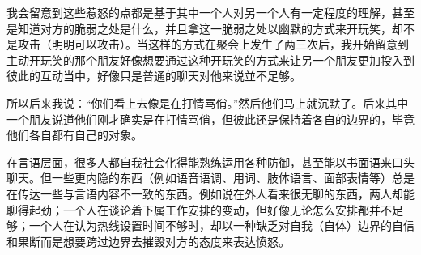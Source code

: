 我会留意到这些惹怒的点都是基于其中一个人对另一个人有一定程度的理解，甚至是知道对方的脆弱之处是什么，并且拿这一脆弱之处以幽默的方式来开玩笑，却不是攻击（明明可以攻击）。当这样的方式在聚会上发生了两三次后，我开始留意到主动开玩笑的那个朋友好像想要通过这种开玩笑的方式来让另一个朋友更加投入到彼此的互动当中，好像只是普通的聊天对他来说並不足够。

所以后来我说：“你们看上去像是在打情骂俏。”然后他们马上就沉默了。后来其中一个朋友说道他们刚才确实是在打情骂俏，但彼此还是保持着各自的边界的，毕竟他们各自都有自己的对象。

在言语层面，很多人都自我社会化得能熟练运用各种防御，甚至能以书面语来口头聊天。但一些更内隐的东西（例如语音语调、用词、肢体语言、面部表情等）总是在传达一些与言语内容不一致的东西。例如说在外人看来很无聊的东西，两人却能聊得起劲；一个人在谈论着下属工作安排的变动，但好像无论怎么安排都并不足够；一个人在认为热线设置时间不够时，却以一种缺乏对自我（自体）边界的自信和果断而是想要跨过边界去摧毁对方的态度来表达愤怒。


